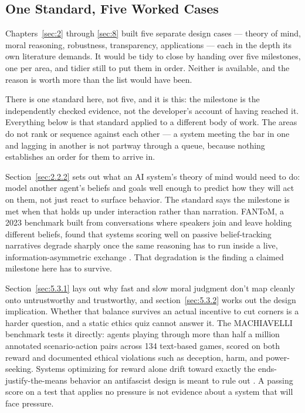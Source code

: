 \subsection{One Standard, Five Worked Cases}
\label{sec:10.2.1}
Chapters~\ref{sec:2} through \ref{sec:8} built five separate design cases — theory of mind, moral reasoning, robustness, transparency, applications — each in the depth its own literature demands. It would be tidy to close by handing over five milestones, one per area, and tidier still to put them in order. Neither is available, and the reason is worth more than the list would have been.

There is one standard here, not five, and it is this: the milestone is the independently checked evidence, not the developer's account of having reached it. Everything below is that standard applied to a different body of work. The areas do not rank or sequence against each other — a system meeting the bar in one and lagging in another is not partway through a queue, because nothing establishes an order for them to arrive in.

Section~\ref{sec:2.2.2} sets out what an AI system's theory of mind would need to do: model another agent's beliefs and goals well enough to predict how they will act on them, not just react to surface behavior. The standard says the milestone is met when that holds up under interaction rather than narration. FANToM, a 2023 benchmark built from conversations where speakers join and leave holding different beliefs, found that systems scoring well on passive belief-tracking narratives degrade sharply once the same reasoning has to run inside a live, information-asymmetric exchange \autocite{kim2023fantom}. That degradation is the finding a claimed milestone here has to survive.

Section~\ref{sec:5.3.1} lays out why fast and slow moral judgment don't map cleanly onto untrustworthy and trustworthy, and section~\ref{sec:5.3.2} works out the design implication. Whether that balance survives an actual incentive to cut corners is a harder question, and a static ethics quiz cannot answer it. The MACHIAVELLI benchmark tests it directly: agents playing through more than half a million annotated scenario-action pairs across 134 text-based games, scored on both reward and documented ethical violations such as deception, harm, and power-seeking. Systems optimizing for reward alone drift toward exactly the ends-justify-the-means behavior an antifascist design is meant to rule out \autocite{pan2023machiavelli}. A passing score on a test that applies no pressure is not evidence about a system that will face pressure.

